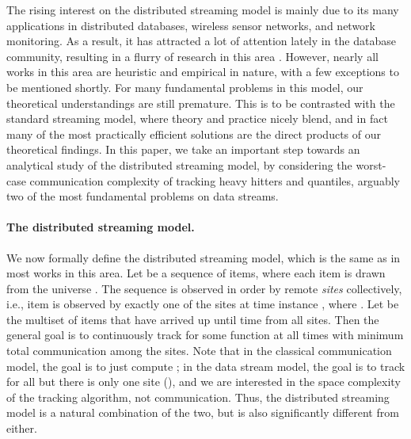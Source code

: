 \documentclass[10pt]{article}
\begin{document}
The rising interest on the distributed streaming model is mainly due to its
many applications in distributed databases, wireless sensor networks, and
network monitoring.  As a result, it has attracted a lot of attention
lately in the database community, resulting in a flurry of research in this
area
\cite{Cormode:Muthukrishnan:Zhuang:07,cormode06:what,keralapura06,Cormode:Garofalakis:Muthukrishnan:Rastogi:05,cormode05:sketch,Olston:Jiang:Widom:03,Babcock:Olston:03,fuller07:_fids,deshpande04:_model,manjhi05:_findin,olston05:_effic,sharfman08:_shape}.
However, nearly all works in this area are heuristic and empirical
in nature, with a few exceptions to be mentioned shortly.  For many
fundamental problems in this model, our theoretical understandings are
still premature.  This is to be contrasted with the standard streaming
model, where theory and practice nicely blend, and in fact many of the most
practically efficient solutions are the direct products of our theoretical
findings.  In this paper, we take an important step towards an analytical
study of the distributed streaming model, by considering the worst-case
communication complexity of tracking heavy hitters and quantiles, arguably
two of the most fundamental problems on data streams.

\paragraph{The distributed streaming model.}
We now formally define the distributed streaming model, which is the same
as in most works in this area.  Let  be a sequence of
items, where each item is drawn from the universe .  The
sequence  is observed in order by  remote {\em sites}  collectively, i.e., item  is observed by exactly one of
the sites at time instance , where .  Let
 be the multiset of items that have arrived up until time  from
all sites.  Then the general goal is to continuously track  for
some function  at all times  with minimum total communication among
the sites.  Note that in the classical communication model, the goal is to
just compute ; in the data stream model, the goal is to
track  for all  but there is only one site (), and we are
interested in the space complexity of the tracking algorithm, not
communication.  Thus, the distributed streaming model is a natural
combination of the two, but is also significantly different from either.
\end{document}
